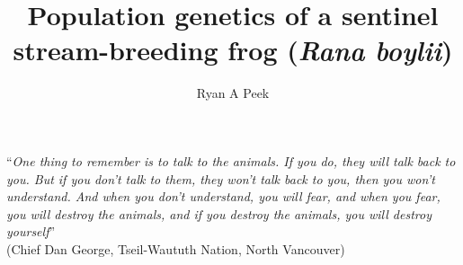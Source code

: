 \documentclass[twoside,12pt,final]{ucthesis-CA2012} %
\begin{document}
\begin{ucfrontmatter}


  \title{Population genetics of a sentinel stream-breeding frog (\emph{Rana
boylii})}

  \author{Ryan A Peek}
   
  \othermemberC{} %

	
	\maketitle
	\approvalpage

    \begin{dedication}

      \vspace*{25ex}
      \begin{center}
      \begin{Large}

        ``\emph{One thing to remember is to talk to the animals. If you do, they
        will talk back to you. But if you don't talk to them, they won't talk
        back to you, then you won't understand. And when you don't understand,
        you will fear, and when you fear, you will destroy the animals, and if
        you destroy the animals, you will destroy yourself}''\\
        (Chief Dan George, Tseil-Waututh Nation, North Vancouver)


\end{Large}
\end{center}
\end{dedication}
\end{ucfrontmatter}
\end{document}

